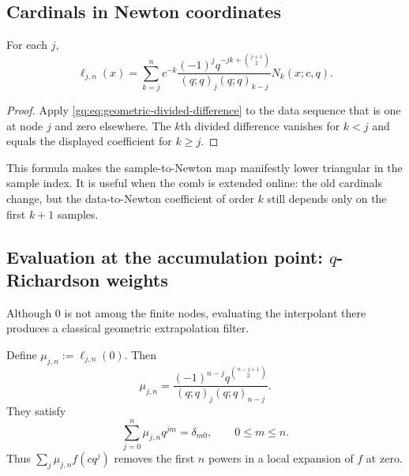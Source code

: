 \subsection{Cardinals in Newton coordinates}

\begin{proposition}
\label{gq:prop:cardinal-newton}
For each $j$,
\begin{equation}
 \boxed{
 \ell_{j,n}(x)=\sum_{k=j}^n
 c^{-k}\frac{(-1)^jq^{-jk+\binom{j+1}{2}}}
 {(q;q)_j(q;q)_{k-j}}N_k(x;c,q).}
 \label{gq:eq:cardinal-newton}
\end{equation}
\end{proposition}

\begin{proof}
Apply \eqref{gq:eq:geometric-divided-difference} to the data sequence that is
one at node $j$ and zero elsewhere.  The $k$th divided difference vanishes
for $k<j$ and equals the displayed coefficient for $k\ge j$.
\end{proof}

This formula makes the sample-to-Newton map manifestly lower triangular in
the sample index.  It is useful when the comb is extended online: the old
cardinals change, but the data-to-Newton coefficient of order $k$ still
depends only on the first $k+1$ samples.

\subsection{Evaluation at the accumulation point: \texorpdfstring{$q$}{q}-Richardson weights}

Although $0$ is not among the finite nodes, evaluating the interpolant there
produces a classical geometric extrapolation filter.

\begin{proposition}
\label{gq:prop:richardson-weights}
Define $\mu_{j,n}:=\ell_{j,n}(0)$.  Then
\begin{equation}
 \boxed{
 \mu_{j,n}=\frac{(-1)^{n-j}
 q^{\binom{n-j+1}{2}}}
 {(q;q)_j(q;q)_{n-j}}.}
 \label{gq:eq:richardson-weights}
\end{equation}
They satisfy
\begin{equation}
 \sum_{j=0}^n\mu_{j,n}q^{jm}=\delta_{m0},
 \qquad 0\le m\le n.
 \label{gq:eq:richardson-moments}
\end{equation}
Thus $\sum_j\mu_{j,n}f(cq^j)$ removes the first $n$ powers in a local
expansion of $f$ at zero.
\end{proposition}

